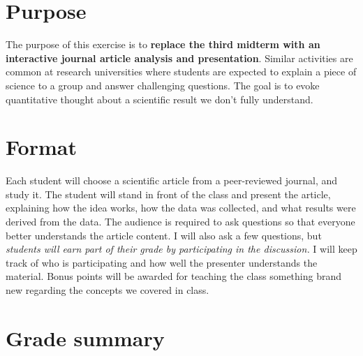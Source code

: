 \documentclass[12pt]{article}
\begin{document}
\maketitle

\section{Purpose}

The purpose of this exercise is to \textbf{replace the third midterm with an interactive journal article analysis and presentation}.  Similar activities are common at research universities where students are expected to explain a piece of science to a group and answer challenging questions.  The goal is to evoke quantitative thought about a scientific result we don't fully understand.

\section{Format}

Each student will choose a scientific article from a peer-reviewed journal, and study it.  The student will stand in front of the class and present the article, explaining how the idea works, how the data was collected, and what results were derived from the data.  The audience is required to ask questions so that everyone better understands the article content.  I will also ask a few questions, but \textit{students will earn part of their grade by participating in the discussion.}  I will keep track of who is participating and how well the presenter understands the material.  Bonus points will be awarded for teaching the class something brand new regarding the concepts we covered in class.

\section{Grade summary}
\end{document}
